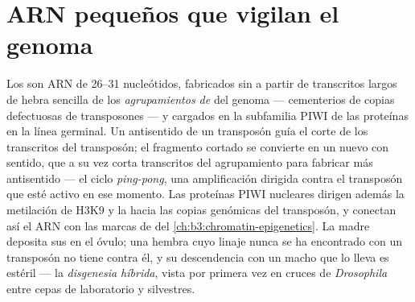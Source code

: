 \section{ARN pequeños que vigilan el genoma}

\begin{definition}\label{def:b3:rna-regulation:pirna}
Los \emph{} son ARN de \numrange{26}{31} nucleótidos, fabricados sin
 a partir de transcritos largos de hebra sencilla de los
\emph{agrupamientos de } del genoma --- cementerios de copias
defectuosas de transposones --- y cargados en la subfamilia PIWI de las
proteínas  en la línea germinal. Un  antisentido de un
transposón guía el corte de los transcritos del transposón; el fragmento
cortado se convierte en un nuevo  con sentido, que a su vez corta
transcritos del agrupamiento para fabricar más  antisentido --- el
ciclo \emph{ping-pong}, una amplificación dirigida contra el transposón
que esté activo en ese momento. Las proteínas PIWI nucleares dirigen
además la metilación de H3K9 y la  hacia las copias
genómicas del transposón, y conectan así el ARN con las marcas de
 del \cref{ch:b3:chromatin-epigenetics}. La madre deposita sus
 en el óvulo; una hembra cuyo linaje nunca se ha encontrado con un
transposón no tiene  contra él, y su descendencia con un macho que
lo lleva es estéril --- la \emph{disgenesia híbrida}, vista por primera
vez en cruces de \emph{Drosophila} entre cepas de laboratorio y
silvestres.
\end{definition}

